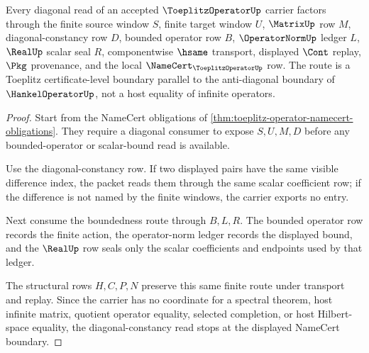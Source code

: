\begin{theorem}
\label{thm:toeplitz-operator-diagonal-constancy-route}
Every diagonal read of an accepted $\ToeplitzOperatorUp$ carrier factors through the finite source window $S$, finite target window $U$, $\MatrixUp$ row $M$, diagonal-constancy row $D$, bounded operator row $B$, $\OperatorNormUp$ ledger $L$, $\RealUp$ scalar seal $R$, componentwise $\hsame$ transport, displayed $\Cont$ replay, $\Pkg$ provenance, and the local $\NameCert_{\ToeplitzOperatorUp}$ row. The route is a Toeplitz certificate-level boundary parallel to the anti-diagonal boundary of $\HankelOperatorUp$, not a host equality of infinite operators.
\end{theorem}
\begin{proof}
Start from the NameCert obligations of \autoref{thm:toeplitz-operator-namecert-obligations}. They require a diagonal consumer to expose $S,U,M,D$ before any bounded-operator or scalar-bound read is available.

Use the diagonal-constancy row. If two displayed pairs have the same visible difference index, the packet reads them through the same scalar coefficient row; if the difference is not named by the finite windows, the carrier exports no entry.

Next consume the boundedness route through $B,L,R$. The bounded operator row records the finite action, the operator-norm ledger records the displayed bound, and the $\RealUp$ row seals only the scalar coefficients and endpoints used by that ledger.

The structural rows $H,C,P,N$ preserve this same finite route under transport and replay. Since the carrier has no coordinate for a spectral theorem, host infinite matrix, quotient operator equality, selected completion, or host Hilbert-space equality, the diagonal-constancy read stops at the displayed NameCert boundary.
\end{proof}



